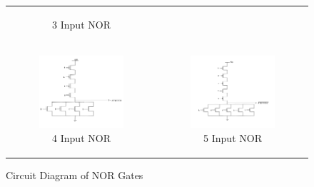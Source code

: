 \documentclass[conference]{IEEEtran}
\begin{document}
\begin{figure}[H]
\begin{tabular}{cc}
\begin{subfigure}{0.44\linewidth}
            \caption{3 Input NOR}
        \end{subfigure} \\
        \begin{subfigure}{0.44\linewidth}
            \centering
            \includegraphics[width=\textwidth]{images/nor_4_cmos_circuit_diagram.png}
            \caption{4 Input NOR}
        \end{subfigure} &
        \begin{subfigure}{0.44\linewidth}
            \centering
            \includegraphics[width=\textwidth]{images/nor_5_cmos_circuit_diagram.png}
            \caption{5 Input NOR}
        \end{subfigure}
    \end{tabular}
    \caption{Circuit Diagram of NOR Gates}
\end{figure}
\end{document}
